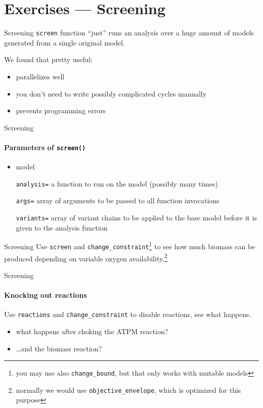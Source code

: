 \documentclass[aspectratio=169]{beamer}
\begin{document}
\section{Exercises --- Screening}

\begin{frame}[fragile]{Screening}
\verb|screen| function ``just'' runs an analysis over a huge amount of models generated from a single original model.

\bigskip
We found that pretty useful:
\begin{itemize}
\item parallelizes well
\item you don't need to write possibly complicated cycles manually
\item prevents programming errors
\end{itemize}
\end{frame}

\begin{frame}[fragile]{Screening}
\framesubtitle{Parameters of {\tt screen()}}
\begin{itemize}
\setlength{\itemindent}{0em}
\setlength{\leftskip}{5em}
\item model
\item[\tt analysis=] a function to run on the model (possibly many times)
\item[\tt args=] array of arguments to be passed to all function invocations
\item[\tt variants=] array of variant chains to be applied to the base model before it is given to the analysis function
\end{itemize}
\end{frame}

\begin{frame}[fragile]{Screening}
Use \verb|screen| and \verb|change_constraint|\footnote{you may use also \texttt{change\_bound}, but that only works with mutable models} to see how much biomass can be produced depending on variable oxygen availability.\footnote{normally we would use \texttt{objective\_envelope}, which is optimized for this purpose}
\end{frame}

\begin{frame}[fragile]{Screening}
\framesubtitle{Knocking out reactions}
Use \verb|reactions| and \verb|change_constraint| to disable reactions, see what happens.

\begin{itemize}
\item what happens after choking the ATPM reaction?
\item \dots and the biomass reaction?
\end{itemize}
\end{frame}
\end{document}
